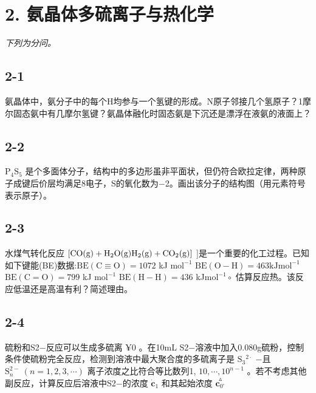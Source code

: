 \section*{2. 氨晶体多硫离子与热化学}
\textit{下列为分问。}

\subsection*{2-1}
氨晶体中，氨分⼦中的每个H均参与⼀个氢键的形成。N原⼦邻接⼏个氢原⼦？1摩尔固态氨中有⼏摩尔氢键？氨晶体融化时固态氨是下沉还是漂浮在液氨的液⾯上？

\subsection*{2-2}
$\mathrm { P } _ { 4 } \mathrm { S } _ { 5 }$ 是个多⾯体分⼦，结构中的多边形虽⾮平⾯状，但仍符合欧拉定律，两种原⼦成键后价层均满⾜8电⼦，S的氧化数为−2。画出该分⼦的结构图（⽤元素符号表⽰原⼦）。

\subsection*{2-3}
⽔煤⽓转化反应 $\mathrm { \small { [ C O ( g ) + H _ { 2 } O ( g )  H _ { 2 } ( g ) + C O _ { 2 } ( g ) ] } }$ ]是⼀个重要的化⼯过程。已知如下键能(BE)数据:$\mathrm { B E } ( \mathrm { C } \equiv \mathrm { O } ) = 1 0 7 2$ kJ $\mathrm { m o l ^ { - 1 } }$ $\mathrm { B E ( O { - } H ) } = 4 6 3 \mathrm { k J } \mathrm { m o l ^ { - 1 } }$ $\mathrm { B E } ( \mathrm { C = O } ) = 7 9 9$ kJ $\mathrm { m o l ^ { - 1 } }$ $\mathrm { B E } ( \mathrm { H } - \mathrm { H } ) = 4 3 6$ kJ$\mathrm { m o l } ^ { - 1 } \circ$ 估算反应热。该反应低温还是⾼温有利？简述理由。

\subsection*{2-4}
硫粉和S2−反应可以⽣成多硫离 $\yen 0$ 。在10mL S2−溶液中加⼊0.080g硫粉，控制条件使硫粉完全反应，检测到溶液中最⼤聚合度的多硫离⼦是 ${ \mathrm { S } } _ { 3 } { } ^ { 2 \cdot }$ −且 ${ \mathrm S } _ { n } ^ { 2 - } ~ ( n = 1 , 2 , 3 , \cdots )$ 离⼦浓度之⽐符合等⽐数列1, $1 0 , \cdots , 1 0 ^ { n - 1 }$ 。若不考虑其他副反应，计算反应后溶液中S2−的浓度 $\dot { \boldsymbol { { c } } } _ { 1 }$ 和其起始浓度 $\overset { \vartriangle } { \boldsymbol { c } _ { 0 ^ { \circ } } }$
